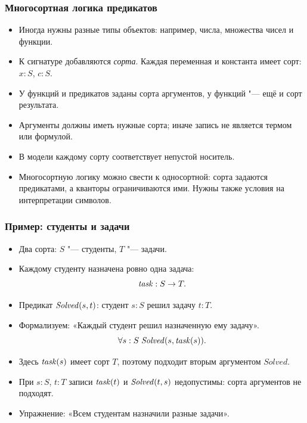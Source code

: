 \documentclass[10pt]{beamer}
\begin{document}
\begin{frame}
    \frametitle{Многосортная логика предикатов}
    \begin{itemize}
        \item Иногда нужны разные типы объектов: например, числа, множества чисел и функции.
        \item К сигнатуре добавляются \emph{сорта}. Каждая переменная и константа имеет сорт: $x:S$, $c:S$.
        \item У функций и предикатов заданы сорта аргументов, у функций "--- ещё и сорт результата.
        \item Аргументы должны иметь нужные сорта; иначе запись не является термом или формулой.
        \item В модели каждому сорту соответствует непустой носитель.
        \item Многосортную логику можно свести к односортной: сорта задаются предикатами, а кванторы ограничиваются ими. Нужны также условия на интерпретации символов.
    \end{itemize}
\end{frame}

\begin{frame}
    \frametitle{Пример: студенты и задачи}
    \begin{itemize}
        \item Два сорта: $S$ "--- студенты, $T$ "--- задачи.
        \item Каждому студенту назначена ровно одна задача:
        \[ \mathit{task}:S\to T. \]
        \item Предикат $\mathit{Solved}(s,t)$: студент $s:S$ решил задачу $t:T$.
        \pause
        \item Формализуем: «Каждый студент решил назначенную ему задачу».
        \pause
        \[ \forall s:S\;\mathit{Solved}(s,\mathit{task}(s)). \]
        \item Здесь $\mathit{task}(s)$ имеет сорт $T$, поэтому подходит вторым аргументом $Solved$.
        \pause
        \item При $s:S$, $t:T$ записи $\mathit{task}(t)$ и $\mathit{Solved}(t,s)$ недопустимы: сорта аргументов не подходят.
        \pause
        \item Упражнение: «Всем студентам назначили разные задачи».
    \end{itemize}
\end{frame}
\end{document}
